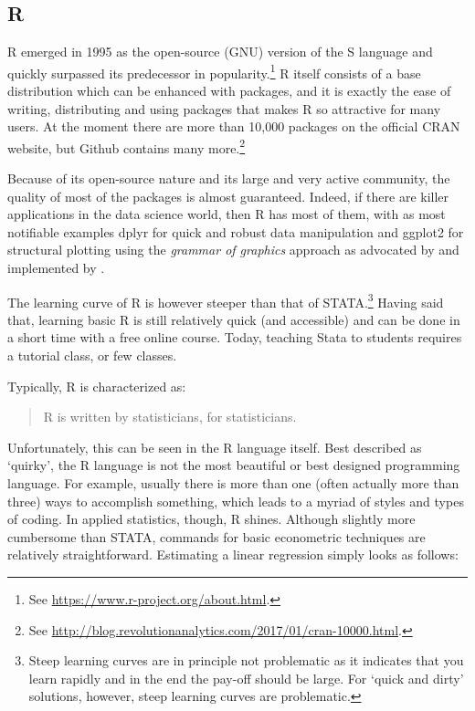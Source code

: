 \documentclass[fleqn,10pt]{SelfArx} %
\begin{document}
\subsection*{R}

R emerged in 1995 as the open-source (GNU) version of the S language and quickly surpassed its predecessor in popularity.\footnote{See \href{https://www.r-project.org/about.html}{https://www.r-project.org/about.html}.} R itself consists of a base distribution which can be enhanced with packages, and it is exactly the ease of writing, distributing and using packages that makes R so attractive for many users. At the moment there are more than 10,000 packages on the official CRAN website, but Github contains many more.\footnote{See \href{http://blog.revolutionanalytics.com/2017/01/cran-10000.html}{http://blog.revolutionanalytics.com/2017/01/cran-10000.html}.}

Because of its open-source nature and its large and very active community, the quality of most of the packages is almost guaranteed. Indeed, if there are killer applications in the data science world, then R has most of them, with as most notifiable examples dplyr for quick and robust data manipulation and ggplot2 for structural plotting using the \textit{grammar of graphics} approach as advocated by \citet{wilkinson2006grammar} and implemented by \citet{wickham2013implementation}. 

The learning curve of R is however steeper than that of STATA.\footnote{Steep learning curves are in principle not problematic as it indicates that you learn rapidly and in the end the pay-off should be large. For `quick and dirty' solutions, however, steep learning curves are problematic.} Having said that, learning basic R is still relatively quick (and accessible) and can be done in a short time with a free online course. Today, teaching Stata to students requires a tutorial class, or few classes. 

Typically, R is characterized as:
\begin{quote}
	R is written by statisticians, for statisticians.
\end{quote}
Unfortunately, this can be seen in the R language itself. Best described as `quirky', the R language is not the most beautiful or best designed programming language. For example, usually there is more than one (often actually more than three) ways to accomplish something, which leads to a myriad of styles and types of coding. In applied statistics, though, R shines. Although slightly more cumbersome than STATA, commands for basic econometric techniques are relatively straightforward. Estimating a linear regression simply looks as follows:
\end{document}
